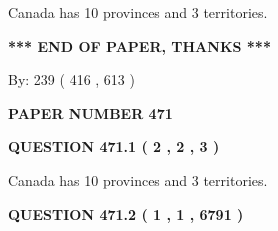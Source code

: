 \documentclass[12pt]{article}
\begin{document}
 
\noindent{}
 
 
Canada has 10  provinces and 3 territories.
 
 
 
 
   
   
 \vspace{0.2in}
 
   
   
   
   
\vspace{1.0in} 
{\textbf{\large{ *** END OF PAPER, THANKS *** }}} 
   
   
\hspace{1.0in} By: 
 239 ( 416 ,  613 )
   
   
   
   
\newpage 
\setcounter{page}{ 
   471001 } 
   
   
   
   
 {\textbf{ \Large{ PAPER NUMBER  471  }}}
   
   
\vspace{0.2in}
   
   
   
   
   
   
 \vspace{0.2in}
 
 
 
 
   
   
  
\vspace{0.2in}
  
{\textbf{\Large{QUESTION
471.1 
 ( 2 , 2 , 3 )
}}}
  
  
 
 
\noindent{}
 
 
Canada has 10  provinces and 3 territories.
 
 
 
 
  
\vspace{0.2in}
  
{\textbf{\Large{QUESTION
471.2 
 ( 1 , 1 , 6791 )
}}}
  
  
 
 
\noindent{}
\end{document}
